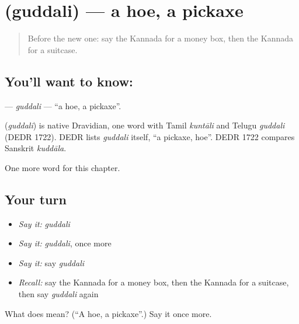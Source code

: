 \section[\texorpdfstring{\kn{ಗುದ್ದಲಿ} (guddali)}{ಗುದ್ದಲಿ (guddali)}]{ (guddali) — a hoe, a pickaxe}

\label{lesson:KA-C230-guddali}



\begin{quote}
Before the new one: say the Kannada for a money box, then the Kannada for a suitcase.
\end{quote}

\subsection*{You'll want to know: }
\textbf{} — \emph{guddali} — \textquotedblleft{}a hoe, a pickaxe\textquotedblright{}.

\begin{cousinweb}
\textbf{} (\emph{guddali}) is native Dravidian, one word with Tamil \emph{kuntāli} and Telugu \emph{guddali} (DEDR 1722). DEDR lists \emph{guddali} itself, \textquotedblleft{}a pickaxe, hoe\textquotedblright{}. DEDR 1722 compares Sanskrit \emph{kuddāla}.
\end{cousinweb}

\begin{grammarlens}[title={What you've built}]
One more word for this chapter.
\end{grammarlens}

\subsection*{Your turn}
\begin{itemize}
\raggedright
  \item \emph{Say it:} \emph{guddali}
  \item \emph{Say it:} \emph{guddali}, once more
  \item \emph{Say it:} say \emph{guddali}
  \item \emph{Recall:} say the Kannada for a money box, then the Kannada for a suitcase, then say \emph{guddali} again
\end{itemize}

\begin{tcolorbox}[breakable,colback=teal!4,colframe=teal!35!black,title={Before you move on}]
What does  mean? (\textquotedblleft{}A hoe, a pickaxe\textquotedblright{}.) Say it once more.
\end{tcolorbox}
